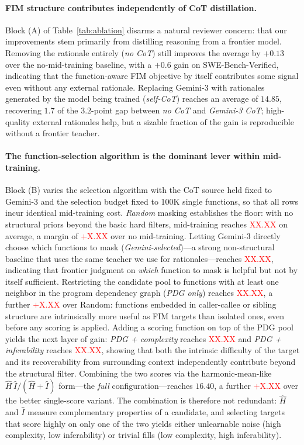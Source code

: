 \paragraph{FIM structure contributes independently of CoT distillation.}
Block (A) of Table~\ref{tab:ablation} disarms a natural reviewer concern:
that our improvements stem primarily from distilling reasoning from a
frontier model. Removing the rationale entirely (\emph{no CoT}) still
improves the average by $+0.13$ over the no-mid-training baseline, with a
$+0.6$ gain on SWE-Bench-Verified, indicating that the function-aware FIM
objective by itself contributes some signal even without any external
rationale. Replacing Gemini-3 with rationales generated by the model
being trained (\emph{self-CoT}) reaches an average of $14.85$, recovering
$1.7$ of the $3.2$-point gap between \emph{no CoT} and \emph{Gemini-3 CoT};
high-quality external rationales help, but a sizable fraction of the
gain is reproducible without a frontier teacher.

\paragraph{The function-selection algorithm is the dominant lever within mid-training.}
Block (B) varies the selection algorithm with the CoT source held fixed
to Gemini-3 and the selection budget fixed to 100K single functions, so
that all rows incur identical mid-training cost.
\emph{Random} masking establishes the floor: with no structural priors
beyond the basic hard filters, mid-training reaches
\textcolor{red}{XX.XX} on average, a margin of \textcolor{red}{$+$X.XX}
over no mid-training. Letting Gemini-3 directly choose which functions
to mask (\emph{Gemini-selected})---a strong non-structural baseline that
uses the same teacher we use for rationales---reaches
\textcolor{red}{XX.XX}, indicating that frontier judgment on \emph{which}
function to mask is helpful but not by itself sufficient. Restricting the
candidate pool to functions with at least one neighbor in the program
dependency graph (\emph{PDG only}) reaches \textcolor{red}{XX.XX}, a
further \textcolor{red}{$+$X.XX} over Random: functions embedded in
caller-callee or sibling structure are intrinsically more useful as FIM
targets than isolated ones, even before any scoring is applied. Adding a
scoring function on top of the PDG pool yields the next layer of gain:
\emph{PDG + complexity} reaches \textcolor{red}{XX.XX} and
\emph{PDG + inferability} reaches \textcolor{red}{XX.XX}, showing that
both the intrinsic difficulty of the target and its recoverability from
surrounding context independently contribute beyond the structural
filter. Combining the two scores via the harmonic-mean-like
$\hat{H}\,\hat{I}/(\hat{H}+\hat{I})$ form---the \emph{full}
configuration---reaches $16.40$, a further \textcolor{red}{$+$X.XX} over
the better single-score variant. The combination is therefore not
redundant: $\hat{H}$ and $\hat{I}$ measure complementary properties of a
candidate, and selecting targets that score highly on only one of the
two yields either unlearnable noise (high complexity, low inferability)
or trivial fills (low complexity, high inferability).